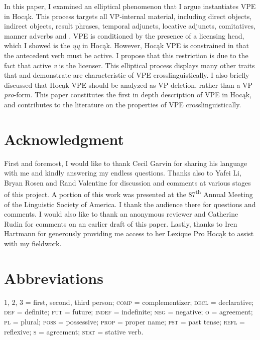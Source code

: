 \documentclass[output=paper]{LSP/langsci}
\begin{document}
 
In this paper, I examined an elliptical phenomenon that I argue instantiates VPE in Hocąk. This process targets all VP-internal material, including direct objects, indirect objects, result phrases, temporal adjuncts, locative adjuncts, comitatives, manner adverbs and  . VPE is conditioned by the presence of a licensing head, which I showed is the  \emph{ųų} in Hocąk. However, Hocąk VPE is constrained in that the antecedent verb must be active. I propose that this restriction is due to the fact that active \emph{v} is the licenser. This elliptical process displays many other traits that \citet{Goldberg2005} and \citet{Fortin2007} demonstrate are characteristic of VPE crosslinguistically. I also briefly discussed that Hocąk VPE should be analyzed as VP deletion, rather than a VP \emph{pro}-form. This paper constitutes the first in depth description of VPE in Hocąk, and contributes to the literature on the properties of VPE crosslinguistically. 
 

\section*{Acknowledgment}

First and foremost, I would like to thank Cecil Garvin for sharing his language with me and kindly answering my endless questions. Thanks also to Yafei Li, Bryan Rosen and Rand Valentine for discussion and comments at various stages of this project. A portion of this work was presented at the 87\textsuperscript{th} Annual Meeting of the Linguistic Society of America. I thank the audience there for questions and comments. I would also like to thank an anonymous reviewer and Catherine Rudin for comments on an earlier draft of this paper. Lastly, thanks to Iren Hartmann for generously providing me access to her Lexique Pro Hocąk  to assist with my fieldwork.

\section*{Abbreviations}
1, 2, 3 = first, second, third person; \textsc{comp} = complementizer; \textsc{decl} = declarative; \textsc{def} = definite; \textsc{fut} = future; \textsc{indef} = indefinite; \textsc{neg} = negative; \textsc{o} =  agreement; \textsc{pl} = plural; \textsc{poss} = possessive; \textsc{prop} = proper name; \textsc{pst} = past tense; \textsc{refl} = reflexive; \textsc{s} =  agreement; \textsc{stat} = stative verb.
 
 \printbibliography[heading=subbibliography,notkeyword=this]
\end{document}
